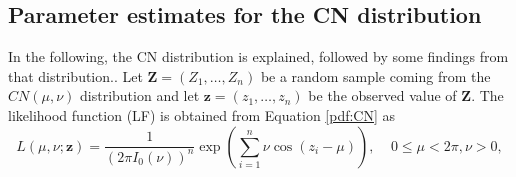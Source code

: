 \documentclass[twoside]{article}
\begin{document}
%

\subsection{Parameter estimates for the CN distribution}
In the following, the CN distribution is explained, followed by some findings from that distribution.. Let $\mathbf{Z}=(Z_1, \ldots, Z_n)$ be a random sample coming from the $CN(\mu,\nu)$ distribution and  let $\mathbf{z}=(z_1,\ldots, z_n)$ be the observed value of $\mathbf{Z}$. 
The likelihood function (LF) is obtained from Equation \eqref{pdf:CN} as
\begin{equation}\label{LF:CN}
L(\mu, \nu ; \mathbf{z})= \frac{1}{(2\pi I_{0}(\nu))^n} \exp{\left(\sum_{i=1}^{n}\nu \cos(z_{i}-\mu)\right)},  ~~~~~ 0\leq \mu < 2\pi, \nu > 0,
\end{equation} 
\end{document}
